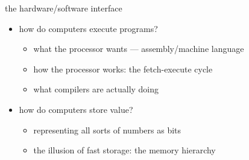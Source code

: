
\begin{frame}{the hardware/software interface}
\begin{itemize}
\item how do computers execute programs?
    \begin{itemize}
    \item what the processor wants --- assembly/machine language
    \item how the processor works: the fetch-execute cycle
    \item what compilers are actually doing
    \end{itemize}
\item how do computers store value?
    \begin{itemize}
    \item representing all sorts of numbers as bits
    \item the illusion of fast storage: the memory hierarchy
    \end{itemize}
\end{itemize}
\end{frame}
